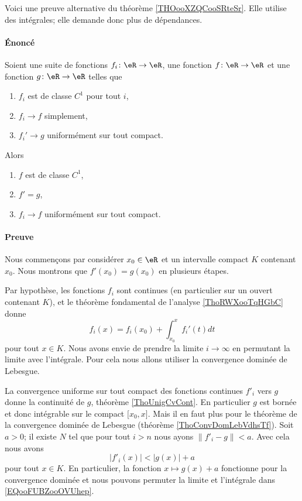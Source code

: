\begin{normaltext}      \label{NORMALooGYUEooKrYjyz}
	Voici une preuve alternative du théorème \ref{THOooXZQCooSRteSr}. Elle utilise des intégrales; elle demande donc plus de dépendances.

	\paragraph{Énoncé}
	Soient une suite de fonctions \( f_i\colon \eR\to \eR\), une fonction \( f\colon \eR\to \eR\) et une fonction \( g\colon \eR\to \eR\) telles que
	\begin{enumerate}
		\item
		      \( f_i\) est de classe \( C^1\) pour tout \( i\),
		\item
		      \( f_i\to f\) simplement,
		\item
		      \( f_i'\to g\) uniformément sur tout compact.
	\end{enumerate}
	Alors
	\begin{enumerate}
		\item
		      \( f\) est de classe \( C^1\),
		\item
		      \( f'=g\),
		\item
		      \( f_i\to f\) uniformément sur tout compact.
	\end{enumerate}
	\paragraph{Preuve}

	Nous commençons par considérer \( x_0\in \eR\) et un intervalle compact \( K\) contenant \( x_0\). Nous montrons que \( f'(x_0)=g(x_0)\) en plusieurs étapes.
	\begin{subproof}
		Par hypothèse, les fonctions \( f_i\) sont continues (en particulier sur un ouvert contenant \( K\)), et le théorème fondamental de l'analyse \ref{ThoRWXooTqHGbC} donne
		\begin{equation}        \label{EQooFUBZooOVUhep}
			f_i(x)=f_i(x_0)+\int_{x_0}^xf_i'(t)dt
		\end{equation}
		pour tout \( x\in K\). Nous avons envie de prendre la limite \( i\to \infty\) en permutant la limite avec l'intégrale. Pour cela nous allons utiliser la convergence dominée de Lebesgue.

		La convergence uniforme sur tout compact des fonctions continues \( f'_i\) vers \( g\) donne la continuité de \( g\), théorème \ref{ThoUnigCvCont}. En particulier \( g\) est bornée et donc intégrable sur le compact \( \mathopen[ x_0 , x \mathclose]\). Mais il en faut plus pour le théorème de la convergence dominée de Lebesgue (théorème \ref{ThoConvDomLebVdhsTf}). Soit \( a>0\); il existe \( N\) tel que pour tout \( i>n\) nous ayons \( \| f'_i-g \|<a\). Avec cela nous avons
		\begin{equation}
			| f'_i(x) |<| g(x) |+a
		\end{equation}
		pour tout \( x\in K\). En particulier, la fonction \( x\mapsto g(x)+a\) fonctionne pour la convergence dominée et nous pouvons permuter la limite et l'intégrale dans \eqref{EQooFUBZooOVUhep}.


\end{subproof}
\end{normaltext}
